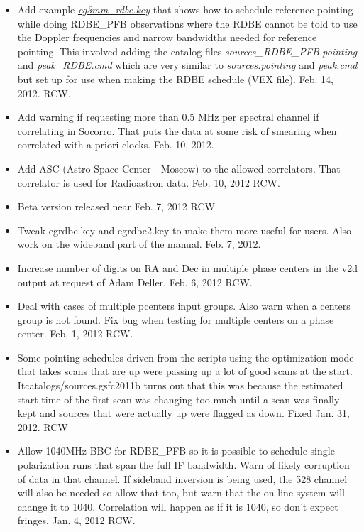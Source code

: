\documentclass{report}
\begin{document}
\begin{itemize}

\item Add example 
{\href{examples/eg3mm\_rdbe.key}{{\sl eg3mm\_rdbe.key}}}
that shows how to schedule reference pointing while doing RDBE\_PFB observations
where the RDBE cannot be told to use the Doppler frequencies and narrow 
bandwidths needed for reference pointing.  This involved adding the catalog files
{\sl sources\_RDBE\_PFB.pointing} and {\sl peak\_RDBE.cmd} which are very 
similar to {\sl sources.pointing} and {\sl peak.cmd} but set up for use when
making the RDBE schedule (VEX file).  Feb. 14, 2012.  RCW.

\item Add warning if requesting more than 0.5 MHz per spectral channel
if correlating in Socorro.  That puts the  data at some risk of smearing
when correlated with a priori clocks.  Feb. 10, 2012.

\item Add ASC (Astro Space Center - Moscow) to the allowed correlators.
That correlator is used for Radioastron data.  Feb. 10, 2012  RCW.

\item Beta version released near Feb. 7, 2012  RCW

\item Tweak egrdbe.key and egrdbe2.key to make them more useful for
users.  Also work on the wideband part of the manual.  Feb. 7, 2012.

\item Increase number of digits on RA and Dec in multiple phase centers
in the v2d output at request of Adam Deller.  Feb. 6, 2012 RCW.

\item Deal with cases of multiple pcenters input groups.  Also warn when
a centers group is not found.  Fix bug when testing for multiple centers
on a phase center.  Feb. 1, 2012  RCW.

\item Some pointing schedules driven from the scripts using the optimization
mode that takes scans that are up were passing up a lot of good scans at the
start.  Itcatalogs/sources.gsfc2011b turns out that this was because the estimated start time of
the first scan was changing too much until a scan was finally kept and 
sources that were actually up were flagged as down.  Fixed Jan. 31, 2012.  RCW

\item Allow 1040MHz BBC for RDBE\_PFB so it is possible to schedule
single polarization runs that span the full IF bandwidth.  Warn
of likely corruption of data in that channel.  If sideband inversion
is being used, the 528 channel will also be needed so allow that too,
but warn that the on-line system will change it to 1040.  Correlation
will happen as if it is 1040, so don't expect fringes.  Jan. 4, 2012 RCW.


\end{itemize}
\end{document}
